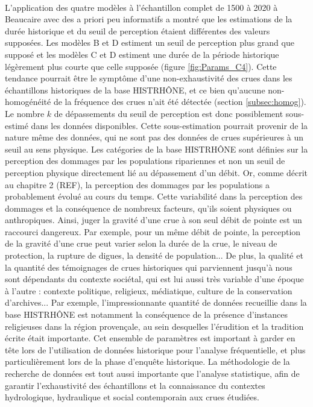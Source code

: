 \documentclass[11pt]{article}
\begin{document}
	\paragraph{} L'application des quatre modèles à l'échantillon complet de 1500 à 2020 à Beaucaire avec des a priori peu informatifs a montré que les estimations de la durée historique et du seuil de perception étaient différentes des valeurs supposées. Les modèles B et D estiment un seuil de perception plus grand que supposé et les modèles C et D estiment une durée de la période historique légèrement plus courte que celle supposée (figure \ref{fig:Params_C4}). Cette tendance pourrait être le symptôme d'une non-exhaustivité des crues dans les échantillons historiques de la base HISTRHÔNE, et ce bien qu'aucune non-homogénéité de la fréquence des crues n'ait été détectée (section \ref{subsec:homog}). Le nombre $k$ de dépassements du seuil de perception est donc possiblement sous-estimé dans les données disponibles. Cette sous-estimation pourrait provenir de la nature même des données, qui ne sont pas des données de crues supérieures à un seuil au sens physique. Les catégories de la base HISTRHÔNE sont définies sur la perception des dommages par les populations ripariennes et non un seuil de perception physique directement lié au dépassement d'un débit. Or, comme décrit au chapitre 2 (REF), la perception des dommages par les populations a probablement évolué au cours du temps. Cette variabilité dans la perception des dommages et la conséquence de nombreux facteurs, qu'ils soient physiques ou anthropiques. Ainsi, juger la gravité d'une crue à son seul débit de pointe est un raccourci dangereux. Par exemple, pour un même débit de pointe, la perception de la gravité d'une crue peut varier selon la durée de la crue, le niveau de protection, la rupture de digues, la densité de population... De plus, la qualité et la quantité des témoignages de crues historiques qui parviennent jusqu'à nous sont dépendants du contexte sociétal, qui est lui aussi très variable d'une époque à l'autre : contexte politique, religieux, médiatique, culture de la conservation d'archives... Par exemple, l'impressionnante quantité de données recueillie dans la base HISTRHÔNE est notamment la conséquence de la présence d'instances religieuses dans la région provençale, au sein desquelles l'érudition et la tradition écrite était importante. Cet ensemble de paramètres est important à garder en tête lors de l'utilisation de données historique pour l'analyse fréquentielle, et plus particulièrement lors de la phase d'enquête historique. La méthodologie de la recherche de données est tout aussi importante que l'analyse statistique, afin de garantir l'exhaustivité des échantillons et la connaissance du contextes hydrologique, hydraulique et social contemporain aux crues étudiées. 	
	
\end{document}

